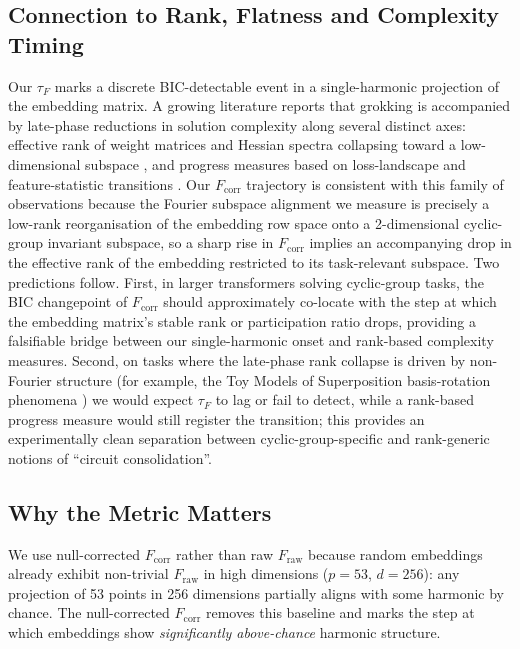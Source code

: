 \documentclass{article}
\newcommand{\tauf}{\tau_{F}}
\newcommand{\fcorr}{F_{\mathrm{corr}}}
\begin{document}
\subsection{Connection to Rank, Flatness and Complexity Timing}
\label{sec:rank_flatness_link}

Our $\tauf$ marks a discrete BIC-detectable event in a
single-harmonic projection of the embedding matrix.
A growing literature reports that grokking is accompanied by
late-phase reductions in solution complexity along several
distinct axes: effective rank of weight matrices and Hessian
spectra collapsing toward a low-dimensional subspace
\citep{mohamadi2024grok}, and progress measures based on
loss-landscape and feature-statistic transitions
\citep{miller2024grokking}.
Our $\fcorr$ trajectory is consistent with this family of
observations because the Fourier subspace alignment we measure is
precisely a low-rank reorganisation of the embedding row space onto
a 2-dimensional cyclic-group invariant subspace, so a sharp rise in
$\fcorr$ implies an accompanying drop in the effective rank of the
embedding restricted to its task-relevant subspace.
Two predictions follow.
First, in larger transformers solving cyclic-group tasks, the BIC
changepoint of $\fcorr$ should approximately co-locate with the
step at which the embedding matrix's stable rank or participation
ratio drops, providing a falsifiable bridge between our
single-harmonic onset and rank-based complexity measures.
Second, on tasks where the late-phase rank collapse is driven by
non-Fourier structure (for example, the Toy Models of
Superposition basis-rotation phenomena
\citep{elhage2022toy}) we would expect $\tauf$ to lag or fail to
detect, while a rank-based progress measure would still register
the transition; this provides an experimentally clean separation
between cyclic-group-specific and rank-generic notions of
``circuit consolidation''.

\subsection{Why the Metric Matters}

We use null-corrected $\fcorr$ rather than raw $F_{\mathrm{raw}}$
because random embeddings already exhibit non-trivial $F_{\mathrm{raw}}$
in high dimensions ($p=53$, $d=256$): any projection of 53 points in
256 dimensions partially aligns with some harmonic by chance.
The null-corrected $\fcorr$ removes this baseline and marks the step
at which embeddings show \emph{significantly above-chance} harmonic
structure.
\end{document}

